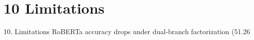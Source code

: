 \section{10 Limitations}

 10. Limitations
RoBERTa accuracy drops under dual-branch factorization (51.26%
